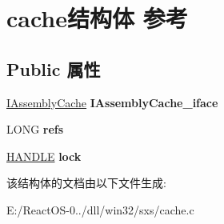 \hypertarget{structcache}{}\section{cache结构体 参考}
\label{structcache}
\subsection*{Public 属性}
\begin{DoxyCompactItemize}
\item 
\mbox{\label{structcache_a3e6a68513adf44b8c35cc49686199945}} 
\hyperlink{interface_i_assembly_cache}{I\+Assembly\+Cache} {\bfseries I\+Assembly\+Cache\+\_\+iface}
\item 
\mbox{\label{structcache_a8ab761c2cb93510e2e5f5e406ef7daaa}} 
L\+O\+NG {\bfseries refs}
\item 
\mbox{\label{structcache_a7eb2cbd9d57863902c56a407b2026880}} 
\hyperlink{interfacevoid}{H\+A\+N\+D\+LE} {\bfseries lock}
\end{DoxyCompactItemize}


该结构体的文档由以下文件生成\+:\begin{DoxyCompactItemize}
\item 
E\+:/\+React\+O\+S-\/0../dll/win32/sxs/cache.\+c\end{DoxyCompactItemize}
